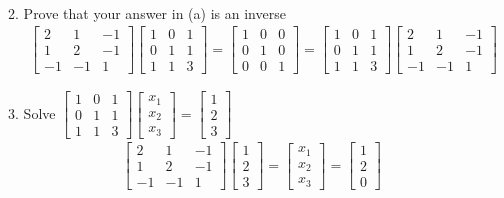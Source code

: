 \documentclass[12pt,a4paper]{paper}
\begin{document}
\begin{enumerate}
\begin{enumerate}
\begin{align*}
\end{align*}
\item Prove that your answer in (a) is an inverse
\begin{align*}
\left[\begin{array}{ccc}2&1&-1\\1&2&-1\\-1&-1&1\end{array}\right]\left[\begin{array}{ccc}1&0&1\\0&1&1\\1&1&3\end{array}\right] = \left[\begin{array}{ccc}1&0&0\\0&1&0\\0&0&1\end{array}\right] = \left[\begin{array}{ccc}1&0&1\\0&1&1\\1&1&3\end{array}\right]\left[\begin{array}{ccc}2&1&-1\\1&2&-1\\-1&-1&1\end{array}\right]
\end{align*}
\item Solve $\left[\begin{array}{ccc}1&0&1\\0&1&1\\1&1&3\end{array}\right]\left[\begin{array}{c}x_1\\x_2\\x_3\end{array}\right]=\left[\begin{array}{c}1\\2\\3\end{array}\right]$
\begin{align*}
\left[\begin{array}{ccc}2&1&-1\\1&2&-1\\-1&-1&1\end{array}\right]\left[\begin{array}{c}1\\2\\3\end{array}\right] = \left[\begin{array}{c}x_{1}\\x_{2}\\x_{3}\end{array}\right] = \left[\begin{array}{c}1\\2\\0\end{array}\right]

\end{align*}
\end{enumerate}
\end{enumerate}
\end{document}
